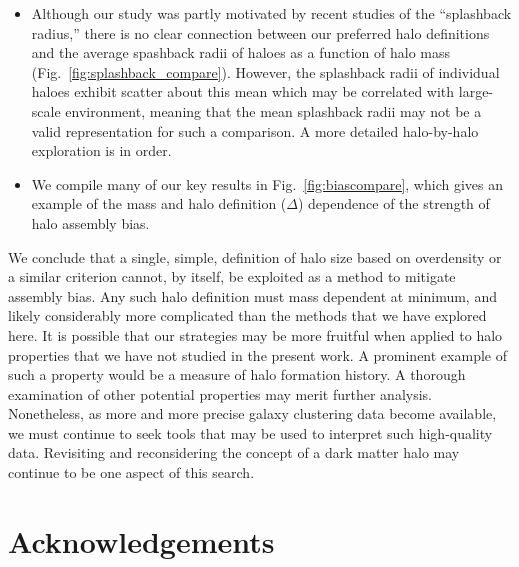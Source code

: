 \documentclass[usenatbib,fleqn]{mnras}
\begin{document}
\begin{itemize}
    \item Although our study was partly motivated by recent studies of the ``splashback radius,'' there is no clear connection between our preferred halo definitions and the average spashback radii of haloes as a function of halo mass (Fig.~\ref{fig:splashback_compare}). However, the splashback radii of individual haloes exhibit scatter about this mean \citep{diemer_etal17} which may be correlated with large-scale environment, meaning that the mean splashback radii may not be a valid representation for such a comparison. A more detailed halo-by-halo exploration is in order.\\
    
    \item We compile many of our key results in Fig.~\ref{fig:biascompare}, which gives an example of the mass and halo definition ($\Delta$) dependence of the strength of halo assembly bias.
    
\end{itemize}

We conclude that a single, simple, definition of halo size based on overdensity or a similar criterion cannot, by itself, be exploited as a method to mitigate assembly bias. Any such halo definition must mass dependent at minimum, and likely considerably more complicated than the methods that we have explored here. It is possible that our strategies may be more fruitful when applied to halo properties that we have not studied in the present work. A prominent example of such a property would be a measure of halo formation history. A thorough examination of other potential properties may merit further analysis. Nonetheless, as more and more precise galaxy clustering data become available, we must continue to seek tools that may be used to interpret such high-quality data. Revisiting and reconsidering the concept of a dark matter halo may continue to be one aspect of this search.

\section*{Acknowledgements}
\end{document}
